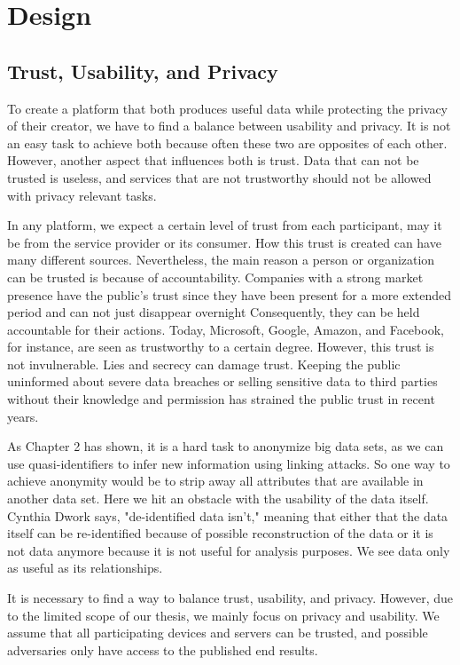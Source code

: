 
\chapter{Design}\label{chapter:design}
\section{Trust, Usability, and Privacy}
To create a platform that both produces useful data while protecting the privacy of their creator, we have to find a balance between usability and privacy. It is not an easy task to achieve both because often these two are opposites of each other. However, another aspect that influences both is trust. Data that can not be trusted is useless, and services that are not trustworthy should not be allowed with privacy relevant tasks.
 
In any platform, we expect a certain level of trust from each participant, may it be from the service provider or its consumer. How this trust is created can have many different sources. Nevertheless, the main reason a person or organization can be trusted is because of accountability. Companies with a strong market presence have the public's trust since they have been present for a more extended period and can not just disappear overnight
 Consequently, they can be held accountable for their actions. Today, Microsoft, Google, Amazon, and Facebook, for instance, are seen as trustworthy to a certain degree. However, this trust is not invulnerable. Lies and secrecy can damage trust. Keeping the public uninformed about severe data breaches or selling sensitive data to third parties without their knowledge and permission has strained the public trust in recent years.

As Chapter 2 has shown, it is a hard task to anonymize big data sets, as we can use quasi-identifiers to infer new information using linking attacks. So one way to achieve anonymity would be to strip away all attributes that are available in another data set. Here we hit an obstacle with the usability of the data itself. Cynthia Dwork \cite{dwork} says, "de-identified data isn't," meaning that either that the data itself can be re-identified because of possible reconstruction of the data or it is not data anymore because it is not useful for analysis purposes. We see data only as useful as its relationships.

It is necessary to find a way to balance trust, usability, and privacy. However, due to the limited scope of our thesis, we mainly focus on privacy and usability. We assume that all participating devices and servers can be trusted, and possible adversaries only have access to the published end results.

